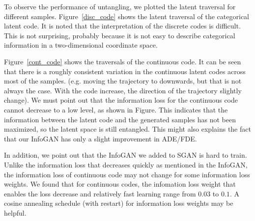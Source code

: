 To observe the performance of untangling, we plotted the latent traversal for different samples. Figure~\ref{disc_code} shows the latent traversal of the categorical latent code. It is noted that the interpretation of the discrete codes is difficult. This is not surprising, probably because it is not easy to describe categorical information in a two-dimensional coordinate space.

Figure~\ref{cont_code} shows the traversals of the continuous code. It can be seen that there is a roughly consistent variation in the continuous latent codes across most of the samples. (e.g. moving the trajectory to downwards, but that is not always the case. With the code increase, the direction of the trajectory slightly change). We must point out that the information loss for the continuous code cannot decrease to a low level, as shown in Figure. This indicates that the information between the latent code and the generated samples has not been maximized, so the latent space is still entangled. This might also explains the fact that our InfoGAN has only a slight improvement in ADE/FDE.


In addition, we point out that the InfoGAN we added to SGAN is hard to train. Unlike the information loss that decreases quickly as mentioned in the InfoGAN, the information loss of continuous code may not change for some information loss weights. We found that for continuous codes, the infomation loss weight that enables the loss decrease and relatively fast learning  range from $0.03$ to $0.1$. A cosine annealing schedule (with restart) for information loss weights may be helpful.

